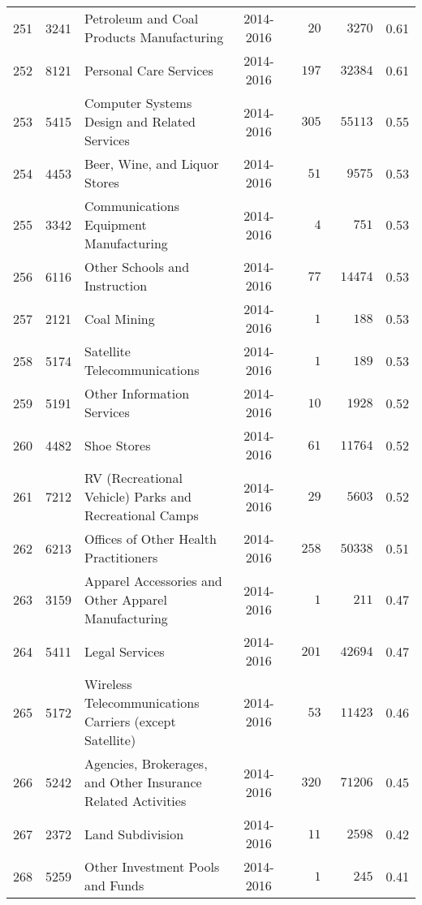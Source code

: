 \documentclass[9pt, oneside]{article}   	%
\begin{document}
\begin{longtable}{lcp{3in}cccc}
251  & 3241 & Petroleum and Coal Products Manufacturing & 2014-2016 & $\phantom{000}20$ & $\phantom{00}3270$ &  0.61 \\
252  & 8121 & Personal Care Services & 2014-2016 & $\phantom{00}197$ & $\phantom{0}32384$ &  0.61 \\
253  & 5415 & Computer Systems Design and Related Services & 2014-2016 & $\phantom{00}305$ & $\phantom{0}55113$ &  0.55 \\
254  & 4453 & Beer, Wine, and Liquor Stores & 2014-2016 & $\phantom{000}51$ & $\phantom{00}9575$ &  0.53 \\
255  & 3342 & Communications Equipment Manufacturing & 2014-2016 & $\phantom{0000}4$ & $\phantom{000}751$ &  0.53 \\
256  & 6116 & Other Schools and Instruction & 2014-2016 & $\phantom{000}77$ & $\phantom{0}14474$ &  0.53 \\
257  & 2121 & Coal Mining & 2014-2016 & $\phantom{0000}1$ & $\phantom{000}188$ &  0.53 \\
258  & 5174 & Satellite Telecommunications & 2014-2016 & $\phantom{0000}1$ & $\phantom{000}189$ &  0.53 \\
259  & 5191 & Other Information Services & 2014-2016 & $\phantom{000}10$ & $\phantom{00}1928$ &  0.52 \\
260  & 4482 & Shoe Stores & 2014-2016 & $\phantom{000}61$ & $\phantom{0}11764$ &  0.52 \\
261  & 7212 & RV (Recreational Vehicle) Parks and Recreational Camps & 2014-2016 & $\phantom{000}29$ & $\phantom{00}5603$ &  0.52 \\
262  & 6213 & Offices of Other Health Practitioners & 2014-2016 & $\phantom{00}258$ & $\phantom{0}50338$ &  0.51 \\
263  & 3159 & Apparel Accessories and Other Apparel Manufacturing & 2014-2016 & $\phantom{0000}1$ & $\phantom{000}211$ &  0.47 \\
264  & 5411 & Legal Services & 2014-2016 & $\phantom{00}201$ & $\phantom{0}42694$ &  0.47 \\
265  & 5172 & Wireless Telecommunications Carriers (except Satellite) & 2014-2016 & $\phantom{000}53$ & $\phantom{0}11423$ &  0.46 \\
266  & 5242 & Agencies, Brokerages, and Other Insurance Related Activities & 2014-2016 & $\phantom{00}320$ & $\phantom{0}71206$ &  0.45 \\
267  & 2372 & Land Subdivision & 2014-2016 & $\phantom{000}11$ & $\phantom{00}2598$ &  0.42 \\
268  & 5259 & Other Investment Pools and Funds & 2014-2016 & $\phantom{0000}1$ & $\phantom{000}245$ &  0.41 \\

\end{longtable}
\end{document}
